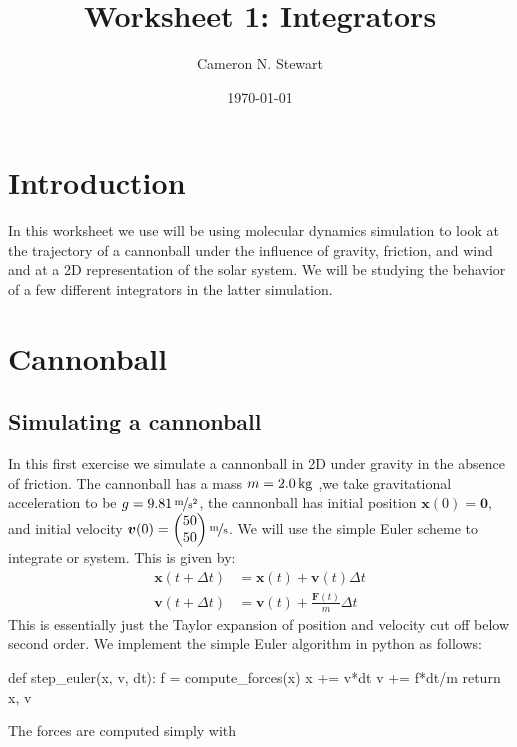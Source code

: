 \documentclass[a4paper,11pt,bibtotoc]{scrartcl}
\begin{document}
\titlehead{Simulation Methods in Physics I \hfill WS 2017/2018}
\title{Worksheet 1: Integrators}
\author{Cameron N. Stewart}
\date{\today}
\publishers{Institute for Computational Physics, University of
  Stuttgart}
\maketitle

\tableofcontents

\section{Introduction}

In this worksheet we use will be using molecular dynamics simulation
to look at the trajectory of a cannonball under the influence of
gravity, friction, and wind and at a 2D representation of the solar
system. We will be studying the behavior of a few different
integrators in the latter simulation.

\section{Cannonball}
\subsection{Simulating a cannonball}
In this first exercise we simulate a cannonball in 2D under gravity in
the absence of friction. The cannonball has a mass
$m = \unit[2.0]{kg}$ ,we take gravitational acceleration to be
$g = \unitfrac[9.81]{m}{s^2}$, the cannonball has initial position
$\bm{x}(0) = \bm{0}$, and initial velocity
$\bm{v}(0) = \begin{pmatrix} 50 \\ 50\\ \end{pmatrix}
\unitfrac{m}{s}$. We will use the simple Euler scheme to integrate or
system. This is given by:
\begin{align}
  \bm{x}(t+\Delta t) &= \bm{x}(t) + \bm{v}(t) \Delta t \\
  \bm{v}(t+\Delta t) &= \bm{v}(t) + \frac{\bm{F}(t)}{m} \Delta t 
\end{align}                       
This is essentially just the Taylor expansion of position and velocity
cut off below second order. We implement the simple Euler algorithm in
python as follows:
\begin{python}
def step_euler(x, v, dt):
    f = compute_forces(x)
    x += v*dt
    v += f*dt/m    
    return x, v
\end{python}
The forces are computed simply with
\end{document}
